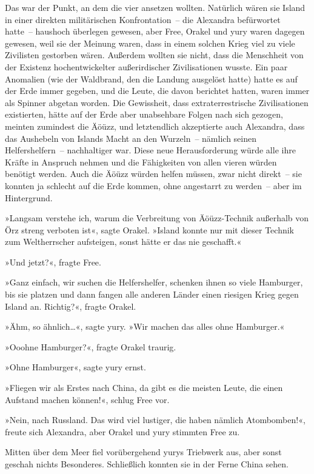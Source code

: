 Das war der Punkt, an dem die vier ansetzen wollten. Natürlich wären sie Island in einer direkten militärischen Konfrontation~– die Alexandra befürwortet hatte~– haushoch überlegen gewesen, aber Free, Orakel und yury waren dagegen gewesen, weil sie der Meinung waren, dass in einem solchen Krieg viel zu viele Zivilisten gestorben wären. Außerdem wollten sie nicht, dass die Menschheit von der Existenz hochentwickelter außerirdischer Zivilisationen wusste. Ein paar Anomalien (wie der Waldbrand, den die Landung ausgelöst hatte) hatte es auf der Erde immer gegeben, und die Leute, die davon berichtet hatten, waren immer als Spinner abgetan worden. Die Gewissheit, dass extraterrestrische Zivilisationen existierten, hätte auf der Erde aber unabsehbare Folgen nach sich gezogen, meinten zumindest die Äöüzz, und letztendlich akzeptierte auch Alexandra, dass das Aushebeln von Islands Macht an den Wurzeln~– nämlich seinen Helfershelfern~– nachhaltiger war. Diese neue Herausforderung würde alle ihre Kräfte in Anspruch nehmen und die Fähigkeiten von allen vieren würden benötigt werden. Auch die Äöüzz würden helfen müssen, zwar nicht direkt~– sie konnten ja schlecht auf die Erde kommen, ohne angestarrt zu werden~– aber im Hintergrund.

»Langsam verstehe ich, warum die Verbreitung von Äöüzz-Technik außerhalb von Örz streng verboten ist«, sagte Orakel. »Island konnte nur mit dieser Technik zum Weltherrscher aufsteigen, sonst hätte er das nie geschafft.«

»Und jetzt?«, fragte Free.

»Ganz einfach, wir suchen die Helfershelfer, schenken ihnen so viele Hamburger, bis sie platzen und dann fangen alle anderen Länder einen riesigen Krieg gegen Island an. Richtig?«, fragte Orakel.

»Ähm, so ähnlich…«, sagte yury. »Wir machen das alles ohne Hamburger.«

»Ooohne Hamburger?«, fragte Orakel traurig.

»Ohne Hamburger«, sagte yury ernst.

»Fliegen wir als Erstes nach China, da gibt es die meisten Leute, die einen Aufstand machen können!«, schlug Free vor.

»Nein, nach Russland. Das wird viel lustiger, die haben nämlich Atombomben!«, freute sich Alexandra, aber Orakel und yury stimmten Free zu.

Mitten über dem Meer fiel vorübergehend yurys Triebwerk aus, aber sonst geschah nichts Besonderes. Schließlich konnten sie in der Ferne China sehen.

